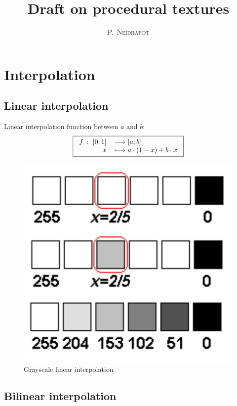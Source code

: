 \documentclass[10pt,a4paper]{article}
\title{Draft on procedural textures}
\author{\textsc{P.~Neidhardt}}
\newcommand{\function}[5]{
  \begin{tabular}{rl}
    #1 $\colon$ #2 & $\longrightarrow$ #3 \\
    #4             & $\longmapsto$     #5
  \end{tabular}
}
\begin{document}
\maketitle

\vfill
\thispagestyle{empty}
\tableofcontents

\section{Interpolation}

\subsection{Linear interpolation}

Linear interpolation function between $a$ and $b$:
\[
\boxed{
  \function {$f$} {$[0;1]$} {$[a;b]$} {$x$} {$a \cdot (1-x) + b \cdot x$}
}
\]

\begin{figure}[p]
  \centering
  \caption{Grayscale linear interpolation}
  \bigskip
  \includegraphics[scale=0.8]{pictures/interpolation}
\end{figure}

\subsection{Bilinear interpolation}
\end{document}
